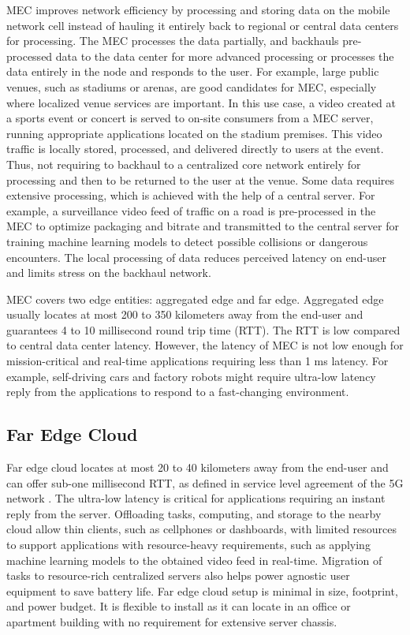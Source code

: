 MEC improves network efficiency by processing and storing data on the mobile network cell instead of hauling it entirely back to regional or central data centers for processing. The MEC processes the data partially, and backhauls pre-processed data to the data center for more advanced processing or processes the data entirely in the node and responds to the user. For example, large public venues, such as stadiums or arenas, are good candidates for MEC, especially where localized venue services are important. In this use case, a video created at a sports event or concert is served to on-site consumers from a MEC server, running appropriate applications located on the stadium premises. This video traffic is locally stored, processed, and delivered directly to users at the event. Thus, not requiring to backhaul to a centralized core network entirely for processing and then to be returned to the user at the venue. Some data requires extensive processing, which is achieved with the help of a central server. For example, a surveillance video feed of traffic on a road is pre-processed in the MEC to optimize packaging and bitrate and transmitted to the central server for training machine learning models to detect possible collisions or dangerous encounters. The local processing of data reduces perceived latency on end-user and limits stress on the backhaul network. \cite{Brown2016}

MEC covers two edge entities: aggregated edge and far edge. Aggregated edge usually locates at most 200 to 350 kilometers away from the end-user and guarantees 4 to 10 millisecond round trip time (RTT). The RTT is low compared to central data center latency. However, the latency of MEC is not low enough for mission-critical and real-time applications requiring less than 1 ms latency. For example, self-driving cars and factory robots might require ultra-low latency reply from the applications to respond to a fast-changing environment.

\subsection{Far Edge Cloud}

Far edge cloud locates at most 20 to 40 kilometers away from the end-user and can offer sub-one millisecond RTT, as defined in service level agreement of the 5G network \cite{Parvez2018}. The ultra-low latency is critical for applications requiring an instant reply from the server. Offloading tasks, computing, and storage to the nearby cloud allow thin clients, such as cellphones or dashboards, with limited resources to support applications with resource-heavy requirements, such as applying machine learning models to the obtained video feed in real-time. Migration of tasks to resource-rich centralized servers also helps power agnostic user equipment to save battery life. Far edge cloud setup is minimal in size, footprint, and power budget. It is flexible to install as it can locate in an office or apartment building with no requirement for extensive server chassis. \cite{AirFrameOpenEdgeServer}

